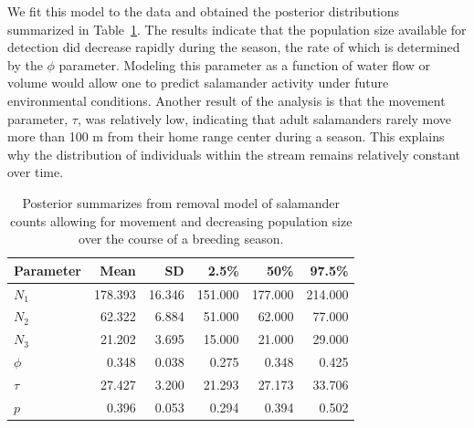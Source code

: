 We fit this model to the data and obtained the posterior distributions
summarized in Table~\ref{unmarked.tab.dusky}. The results indicate that
the population size available for detection did decrease
rapidly during the season, the rate of which is determined by the
$\phi$ parameter. Modeling this parameter as a function of water flow
or volume would allow one to predict salamander activity under future
environmental conditions.
Another result of the analysis is that the movement parameter, $\tau$,
was relatively low, indicating that adult salamanders rarely move more
than 100 m
from their home range center during a season. This explains
why the distribution of individuals within the stream remains
relatively constant over time. %

\begin{table}
  \centering
  \caption{Posterior summarizes from removal model of salamander
    counts allowing for movement and decreasing population size over
    the course of a breeding season.}
  \begin{tabular}{lrrrrr}
    \hline
    Parameter & Mean    & SD     & 2.5\%   & 50\%    & 97.5\%  \\
    \hline
    $N_1$     & 178.393 & 16.346 & 151.000 & 177.000 & 214.000 \\
    $N_2$     & 62.322  & 6.884  & 51.000  & 62.000  & 77.000  \\
    $N_3$     & 21.202  & 3.695  & 15.000  & 21.000  & 29.000  \\
    $\phi$    & 0.348   & 0.038  & 0.275   & 0.348   & 0.425   \\
    $\tau$    & 27.427  & 3.200  & 21.293  & 27.173  & 33.706  \\
    $p$       & 0.396   & 0.053  & 0.294   & 0.394   & 0.502   \\
    \hline
  \end{tabular}
  \label{unmarked.tab.dusky}
\end{table}



